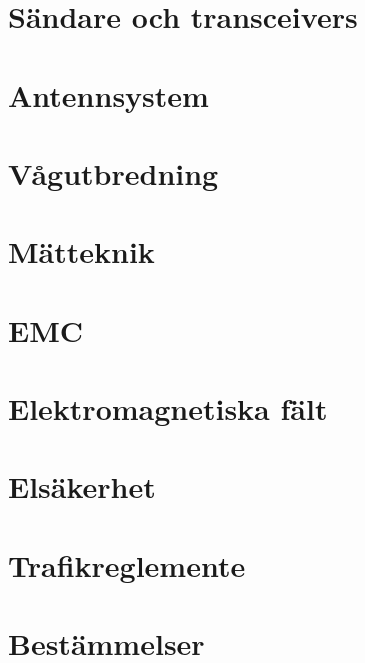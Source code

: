 \chapter[Sändare]{Sändare och transceivers}
% 
% 
%
\chapter{Antennsystem}
% 
% 
% 
% 
% 
% 
%
\chapter{Vågutbredning}
% 
% 
% 
% 
% 
% 
% 
%
\chapter{Mätteknik}
% 
% 
%
\chapter{EMC}
% 
% 
% 
% 
%
\chapter{Elektromagnetiska fält}
% 
%
\chapter{Elsäkerhet}
% 
% 
% 
% 
%
%
%
\chapter{Trafikreglemente}
% 
% 
% 
% 
% 
% 
%
\chapter{Bestämmelser}
% 
% 
% 
%
